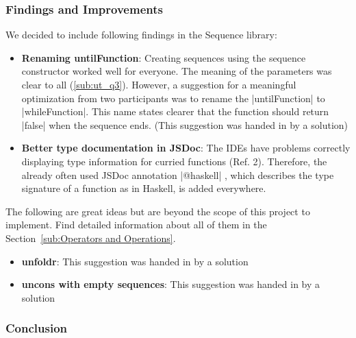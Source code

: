 \subsubsection{Findings and Improvements} %
\label{subsub:seq_findings_and_improvements}
We decided to include following findings in the Sequence library:
\begin{itemize}
  \item \textbf{Renaming untilFunction}: Creating sequences using the sequence
    constructor worked well for everyone. The meaning of the parameters was
    clear to all (\ref{sub:ut_q3}). However, a suggestion for a meaningful
    optimization from two participants was to rename the |untilFunction| to
    |whileFunction|. This name states clearer that the function should return
    |false| when the sequence ends. (This suggestion was handed in by a
    solution)
  \item \textbf{Better type documentation in JSDoc}: The IDEs have problems
    correctly displaying type information for curried functions (Ref. 2).
    Therefore, the already often used JSDoc annotation |@haskell| , which
    describes the type signature of a function as in Haskell, is added
    everywhere.
\end{itemize}
The following are great ideas but are beyond the scope of this project to
implement. Find detailed information about all of them in the
Section~\ref{sub:Operators and Operations}.
\begin{itemize}
  \item \textbf{unfoldr}: This suggestion was handed in by a solution
  \item \textbf{uncons with empty sequences}: This suggestion was handed in by a solution
\end{itemize}

\subsubsection{Conclusion} %

